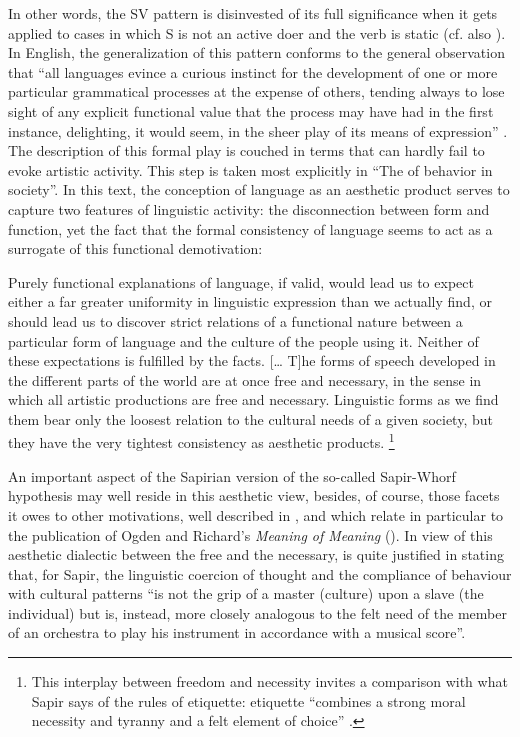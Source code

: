 \documentclass[output=paper]{langscibook}
\begin{document}
In other words, the SV pattern is disinvested of its full significance when it gets applied to cases in which S is not an active doer and the verb is static (cf. also \citealt[14--15]{Sapir1921}). In English, the generalization of this pattern conforms to the general observation that ``all languages evince a curious instinct for the development of one or more particular grammatical processes at the expense of others, tending always to lose sight of any explicit functional value that the process may have had in the first instance, delighting, it would seem, in the sheer play of its means of expression'' \citep[60]{Sapir1921}. The description of this formal play is couched in terms that can hardly fail to evoke artistic activity. This step is taken most explicitly in ``The  of behavior in society''. In this text, the conception of language as an aesthetic product serves to capture two features of linguistic activity: the disconnection between form and function, yet the fact that the formal consistency of language seems to act as a surrogate of this functional demotivation:

\begin{modquote}
Purely functional explanations of language, if valid, would lead us to expect either a far greater uniformity in linguistic expression than we actually find, or should lead us to discover strict relations of a functional nature between a particular form of language and the culture of the people using it. Neither of these expectations is fulfilled by the facts. [… T]he forms of speech developed in the different parts of the world are at once free and necessary, in the sense in which all artistic productions are free and necessary. Linguistic forms as we find them bear only the loosest relation to the cultural needs of a given society, but they have the very tightest consistency as aesthetic products. \citep[550]{Sapir1927b}\footnote{This interplay between freedom and necessity invites a comparison with what Sapir says of the rules of etiquette: etiquette ``combines a strong moral necessity and tyranny and a felt element of choice'' \citep[236]{Sapir2002}.} 
\end{modquote}

An important aspect of the Sapirian version of the so-called Sapir-Whorf hypothesis may well reside in this aesthetic view, besides, of course, those facets it owes to other motivations, well described in \citet{Joseph2002sapirwhorf}, and which relate in particular to the publication of Ogden and Richard's \emph{Meaning of Meaning} (\citeyear{Ogden1923}). In view of this aesthetic dialectic between the free and the necessary, \citet[462]{Allen1986} is quite justified in stating that, for Sapir, the linguistic coercion of thought and the compliance of behaviour with cultural patterns ``is not the grip of a master (culture) upon a slave (the individual) but is, instead, more closely analogous to the felt need of the member of an orchestra to play his instrument in accordance with a musical score''.
\end{document}
